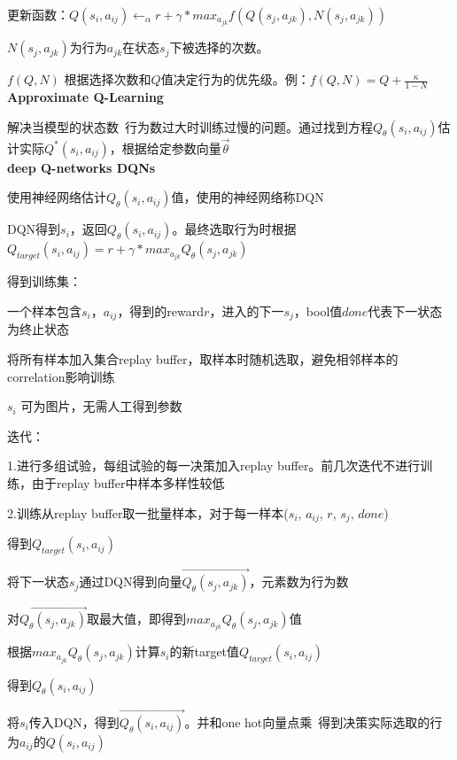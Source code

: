 \documentclass[UTF8]{ctexart}
\begin{document}
  \quad 更新函数：$Q(s_i, a_{ij}) \leftarrow_{\alpha} r + \gamma * max_{a_{jk}} f(Q(s_j, a_{jk}), N(s_j, a_{jk}))$
  
  \quad \quad $N(s_j, a_{jk})$为行为$a_{jk}$在状态$s_j$下被选择的次数。
  
  \quad \quad $f(Q, N)$ 根据选择次数和$Q$值决定行为的优先级。例：$f(Q, N) = Q + \frac{\kappa}{1 - N} $\\
\textbf{Approximate Q-Learning}

  解决当模型的状态数\ 行为数过大时训练过慢的问题。通过找到方程$Q_{\theta}(s_i, a_{ij})$估计实际$Q^*(s_i, a_{ij})$，根据给定参数向量$\vec{\theta}$\\
\textbf{deep Q-networks DQNs}

  使用神经网络估计$Q_{\theta}(s_i, a_{ij})$值，使用的神经网络称DQN
  
  DQN得到$s_i$，返回$Q_{\theta}(s_i, a_{ij})$。最终选取行为时根据$Q_{target}(s_i, a_{ij}) = r + \gamma * max_{a_{jk}} Q_{\theta}(s_j, a_{jk})$

  得到训练集：

  \quad 一个样本包含$s_i$，$a_{ij}$，得到的reward$r$，进入的下一$s_j$，bool值$done$代表下一状态为终止状态

  \quad 将所有样本加入集合replay buffer，取样本时随机选取，避免相邻样本的correlation影响训练

  \quad $s_i$ 可为图片，无需人工得到参数
  
  迭代：
  
  \quad 1.进行多组试验，每组试验的每一决策加入replay buffer。前几次迭代不进行训练，由于replay buffer中样本多样性较低
  
  \quad 2.训练从replay buffer取一批量样本，对于每一样本($s_i$, $a_{ij}$, $r$, $s_j$, $done$)

  \quad \quad 得到$Q_{target}(s_i, a_{ij})$
  
  \quad \quad \quad 将下一状态$s_j$通过DQN得到向量$\vec{Q_{\theta}(s_j, a_{jk})}$，元素数为行为数

  \quad \quad \quad 对$\vec{Q_{\theta}(s_j, a_{jk})}$取最大值，即得到$max_{a_{jk}} Q_{\theta}(s_j, a_{jk})$值

  \quad \quad \quad 根据$max_{a_{jk}} Q_{\theta}(s_j, a_{jk})$计算$s_i$的新target值$Q_{target}(s_i, a_{ij})$

  \quad \quad 得到$Q_{\theta}(s_i, a_{ij})$

  \quad \quad \quad 将$s_i$传入DQN，得到$\vec{Q_{\theta}(s_i, a_{ij})}$。并和one hot向量点乘\ 得到决策实际选取的行为$a_{ij}$的$Q(s_i, a_{ij})$
\end{document}
